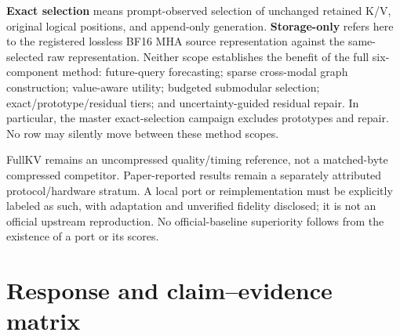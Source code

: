 \documentclass[10pt]{article}
\begin{document}
\textbf{Exact selection} means prompt-observed selection of unchanged retained
K/V, original logical positions, and append-only generation.
\textbf{Storage-only} refers here to the registered lossless BF16 MHA source
representation against the same-selected raw representation. Neither scope
establishes the benefit of the full six-component method: future-query
forecasting; sparse cross-modal graph construction; value-aware utility;
budgeted submodular selection; exact/prototype/residual tiers; and
uncertainty-guided residual repair. In particular, the master exact-selection
campaign excludes prototypes and repair. No row may silently move between
these method scopes.

FullKV remains an uncompressed quality/timing reference, not a matched-byte
compressed competitor. Paper-reported results remain a separately attributed
protocol/hardware stratum. A local port or reimplementation must be explicitly
labeled as such, with adaptation and unverified fidelity disclosed; it is not
an official upstream reproduction. No official-baseline superiority follows
from the existence of a port or its scores.

\section*{Response and claim--evidence matrix}
\end{document}
